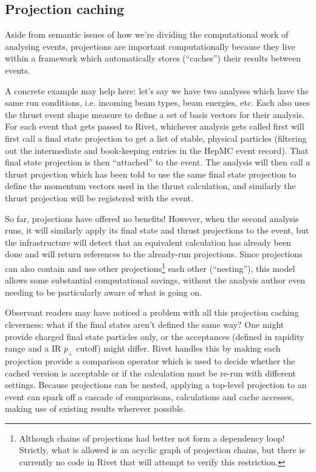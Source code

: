\documentclass{JHEP3}
\newcommand{\pT}{\ensuremath{p_\perp}\xspace}
\begin{document}
\subsection{Projection caching}
Aside from semantic issues of how we're dividing the computational work of
analysing events, projections are important computationally because they live
within a framework which automatically stores (``caches'') their results between
events.

A concrete example may help here: let's say we have two analyses which
have the same run conditions, i.e. incoming beam types, beam energies, etc. Each
also uses the thrust event shape measure to define a set of basis vectors for
their analysis. For each event that gets passed to Rivet, whichever analysis
gets called first will first call a final state projection to get a list of
stable, physical particles (filtering out the intermediate and book-keeping
entries in the HepMC event record). That final state projection is then
``attached'' to the event. The analysis will then call a thrust projection which
has been told to use the same final state projection to define the momentum
vectors used in the thrust calculation, and similarly the thrust projection will
be registered with the event.

So far, projections have offered no benefits! However, when the second analysis
runs, it will similarly apply its final state and thrust projections to the
event, but the infrastructure will detect that an equivalent calculation has
already been done and will return references to the already-run
projections. Since projections can also contain and use other
projections\footnote{Although chains of projections had better not form a
  dependency loop! Strictly, what is allowed is an acyclic graph of projection
  chains, but there is currently no code in Rivet that will attempt to verify
  this restriction.} each other (``nesting''), this model allows some substantial
computational savings, without the analysis author even needing to be
particularly aware of what is going on.

Observant readers may have noticed a problem with all this projection caching
cleverness: what if the final states aren't defined the same way? One might
provide charged final state particles only, or the acceptances (defined in
rapidity range and a IR \pT cutoff) might differ. Rivet handles this by
making each projection provide a comparison operator which is used to decide
whether the cached version is acceptable or if the calculation must be re-run
with different settings. Because projections can be nested, applying a top-level
projection to an event can spark off a cascade of comparisons, calculations and
cache accesses, making use of existing results wherever possible.
\end{document}
